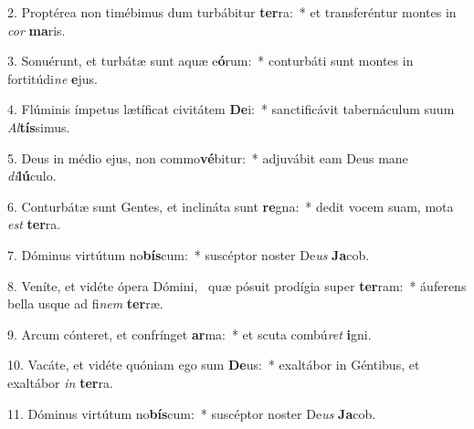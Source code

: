 2. Proptérea non timébimus dum turbábitur \textbf{ter}ra:~*  et transferéntur montes in \textit{cor} \textbf{ma}ris.\

3. Sonuérunt, et turbátæ sunt aquæ e\textbf{ó}rum:~*  conturbáti sunt montes in fortitúdi\textit{ne} \textbf{e}jus.\

4. Flúminis ímpetus lætíficat civitátem \textbf{De}i:~*  sanctificávit tabernáculum suum \textit{Al}\textbf{tís}simus.\

5. Deus in médio ejus, non commo\textbf{vé}bitur:~*  adjuvábit eam Deus mane \textit{di}\textbf{lú}culo.\

6. Conturbátæ sunt Gentes, et inclináta sunt \textbf{re}gna:~*  dedit vocem suam, mota \textit{est} \textbf{ter}ra.\

7. Dóminus virtútum no\textbf{bís}cum:~*  suscéptor noster De\textit{us} \textbf{Ja}cob.\

8. Veníte, et vidéte ópera Dómini, \dag\  quæ pósuit prodígia super \textbf{ter}ram:~*  áuferens bella usque ad fi\textit{nem} \textbf{ter}ræ.\

9. Arcum cónteret, et confrínget \textbf{ar}ma:~*  et scuta combú\textit{ret} \textbf{i}gni.\

10. Vacáte, et vidéte quóniam ego sum \textbf{De}us:~*  exaltábor in Géntibus, et exaltábor \textit{in} \textbf{ter}ra.\

11. Dóminus virtútum no\textbf{bís}cum:~*  suscéptor noster De\textit{us} \textbf{Ja}cob.\

